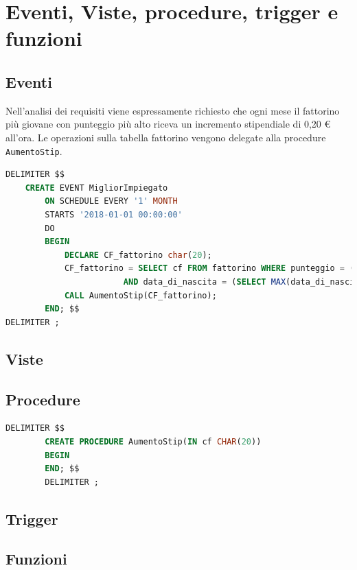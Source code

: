 \documentclass[10pt]{article}
\begin{document}
	\section{Eventi, Viste, procedure, trigger e funzioni}
		\subsection{Eventi}
		Nell'analisi dei requisiti viene espressamente richiesto che ogni mese il fattorino pi\`u giovane con punteggio pi\`u alto riceva un incremento stipendiale di 0,20 \euro{} all'ora.
		Le operazioni sulla tabella fattorino vengono delegate alla procedure \texttt{AumentoStip}.
		\begin{lstlisting}[language=sql]
DELIMITER $$
	CREATE EVENT MigliorImpiegato
		ON SCHEDULE EVERY '1' MONTH
		STARTS '2018-01-01 00:00:00'
		DO 
		BEGIN
			DECLARE CF_fattorino char(20);
			CF_fattorino = SELECT cf FROM fattorino WHERE punteggio = (SELECT MAX(punteggio) FROM fattorino) 
						AND data_di_nascita = (SELECT MAX(data_di_nascita) FROM fattorino);
			CALL AumentoStip(CF_fattorino);
		END; $$
DELIMITER ;\end{lstlisting}
		\subsection{Viste}
		\subsection{Procedure}
		\begin{lstlisting}[language=sql]
		DELIMITER $$
		CREATE PROCEDURE AumentoStip(IN cf CHAR(20))
		BEGIN
		END; $$
		DELIMITER ;
		\end{lstlisting}
		\subsection{Trigger}
		\subsection{Funzioni}
	
\end{document}
